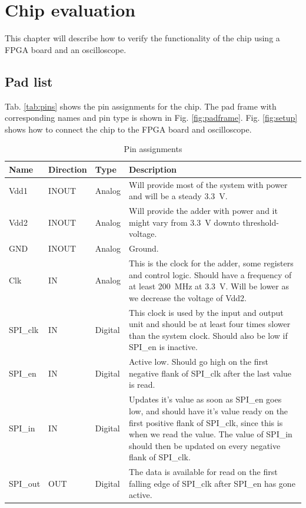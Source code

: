 \section{Chip evaluation}
This chapter will describe how to verify the functionality of the chip using a FPGA board and an oscilloscope.

\subsection{Pad list}
Tab. \ref{tab:pins} shows the pin assignments for the chip. The pad frame with corresponding names and pin type is shown in Fig. \ref{fig:padframe}. Fig. \ref{fig:setup} shows how to connect the chip to the FPGA board and oscilloscope.

\begin{table}[H]
  \caption{Pin assignments}
  \centering
  \begin{tabularx}{\linewidth}{|l|l|l|X|}
    \hline
    \textbf{Name} & \textbf{Direction} & \textbf{Type} & \textbf{Description} \\ \hline
    Vdd1 & INOUT & Analog & Will provide most of the system with power and will be a steady \SI{3.3}{\volt}. \\ \hline
    Vdd2 & INOUT & Analog & Will provide the adder with power and it might vary from \SI{3.3}{\volt} downto threshold-voltage. \\ \hline
    GND &  INOUT & Analog & Ground. \\ \hline
    Clk & IN & Analog & This is the clock for the adder, some registers and control logic. Should have a frequency of at least \SI{200}{\mega\hertz} at \SI{3.3}{\volt}. Will be lower as we decrease the voltage of Vdd2. \\ \hline
    SPI\_clk & IN & Digital & This clock is used by the input and output unit and should be at least four times slower than the system clock. Should also be low if SPI\_en is inactive. \\ \hline
    SPI\_en & IN & Digital & Active low. Should go high on the first negative flank of SPI\_clk after the last value is read. \\ \hline
    SPI\_in & IN & Digital & Updates it's value as soon as SPI\_en goes low, and should have it's value ready on the first positive flank of SPI\_clk, since this is when we read the value. The value of SPI\_in should then be updated on every negative flank of SPI\_clk. \\ \hline
    SPI\_out & OUT & Digital & The data is available for read on the first falling edge of SPI\_clk after SPI\_en has gone active. \\ \hline

\end{tabularx}
\end{table}
